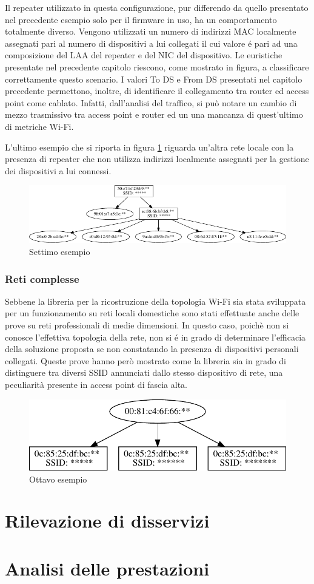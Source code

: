 Il repeater utilizzato in questa configurazione, pur differendo da quello presentato nel precedente esempio solo per il firmware in uso, ha un comportamento totalmente diverso.
Vengono utilizzati un numero di indirizzi MAC localmente assegnati pari al numero di dispositivi a lui collegati il cui valore \'e pari ad una composizione del LAA del repeater e del NIC del dispositivo.
Le euristiche presentate nel precedente capitolo riescono, come mostrato in figura, a classificare correttamente questo scenario.
I valori To DS e From DS presentati nel capitolo precedente permettono, inoltre, di identificare il collegamento tra router ed access point come cablato.
Infatti, dall'analisi del traffico, si pu\`o notare un cambio di mezzo trasmissivo tra access point e router ed un una mancanza di quest'ultimo di metriche Wi-Fi.

L'ultimo esempio che si riporta in figura \ref{fig:es7} riguarda un'altra rete locale con la presenza di repeater che non utilizza indirizzi localmente assegnati per la gestione dei dispositivi a lui connessi.
  
\begin{figure}[!h]
	\centering
	\includegraphics{images/img14censored.pdf}
	\caption{Settimo esempio}
	\label{fig:es7}
\end{figure}

\subsubsection{Reti complesse}
Sebbene la libreria per la ricostruzione della topologia Wi-Fi sia stata sviluppata per un funzionamento su reti locali domestiche sono stati effettuate anche delle prove su reti professionali di medie dimensioni.
In questo caso, poich\`e non si conosce l'effettiva topologia della rete, non si \'e in grado di determinare l'efficacia della soluzione proposta se non constatando la presenza di dispositivi personali collegati.
Queste prove hanno per\`o mostrato come la libreria sia in grado di distinguere tra diversi SSID annunciati dallo stesso dispositivo di rete, una peculiarit\`a presente in access point di fascia alta.


\begin{figure}[!h]
	\centering
	\includegraphics{images/img15censored.pdf}
	\caption{Ottavo esempio}
	\label{fig:es8}
\end{figure}


\section{Rilevazione di disservizi}
\section{Analisi delle prestazioni}
